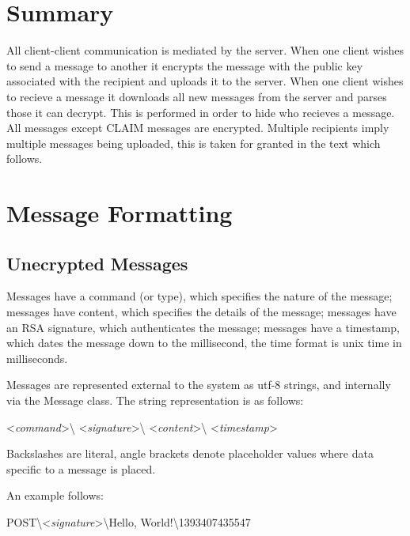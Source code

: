 \section{Summary}
All client-client communication is mediated by the server. When one client
wishes to send a message to another it encrypts the message with the public key
associated with the recipient and uploads it to the server. When one client
wishes to recieve a message it downloads all new messages from the server and
parses those it can decrypt. This is performed in order to hide who recieves a
message. All messages except CLAIM messages are encrypted. Multiple recipients
imply multiple messages being uploaded, this is taken for granted in the text
which follows.

\section{Message Formatting}
\subsection{Unecrypted Messages}
Messages have a command (or type), which specifies the nature of the message;
messages have content, which specifies the details of the message;
messages have an RSA signature, which authenticates the message;
messages have a timestamp, which dates the message down to the millisecond, the
time format is unix time in milliseconds.

Messages are represented external to the system as utf-8 strings, and internally
via the Message class. The string representation is as follows:\\

\begin{center}
\textless \textit{command}\textgreater\textbackslash
\textless \textit{signature}\textgreater\textbackslash
\textless \textit{content}\textgreater\textbackslash
\textless \textit{timestamp}\textgreater
\end{center}

Backslashes are literal, angle brackets denote placeholder values where data
specific to a message is placed.

An example follows:
\begin{center}
POST\textbackslash\textless\textit{signature}\textgreater\textbackslash Hello, World!\textbackslash 1393407435547
\end{center}

